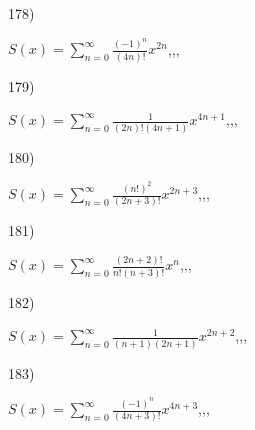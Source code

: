 \documentclass[11pt, ukrainian]{article}
\begin{document}
\par
\vspace{0.9cm}
178) \space 
{%
{$S(x)=\sum\limits_{n=0}^{\infty}{\frac{(-1)^n}{(4n)!}}{x^{{2n}}}$},,, \par \smallskip  
}
\par
\vspace{0.9cm}
179) \space 
{%
{$S(x)=\sum\limits_{n=0}^{\infty}{\frac{1}{(2n)!(4n+1)}}{x^{{4n+1}}}$},,, \par \smallskip  
}
\par
\vspace{0.9cm}
180) \space 
{%
{$S(x)=\sum\limits_{n=0}^{\infty}{\frac{(n!)^2}{(2n+3)!}}{x^{{2n+3}}}$},,, \par \smallskip  
}
\par
\newpage
181) \space 
{%
{$S(x)=\sum\limits_{n=0}^{\infty}{\frac{(2n+2)!}{n!(n+3)!}}{x^{n}}$},,, \par \smallskip  
}
\par
\vspace{0.9cm}
182) \space 
{%
{$S(x)=\sum\limits_{n=0}^{\infty}{\frac{1}{(n+1)(2n+1)}}{x^{{2n+2}}}$},,, \par \smallskip  
}
\par
\vspace{0.9cm}
183) \space 
{%
{$S(x)=\sum\limits_{n=0}^{\infty}{\frac{(-1)^n}{(4n+3)!}}{x^{{4n+3}}}$},,, \par \smallskip  
}
\end{document}
